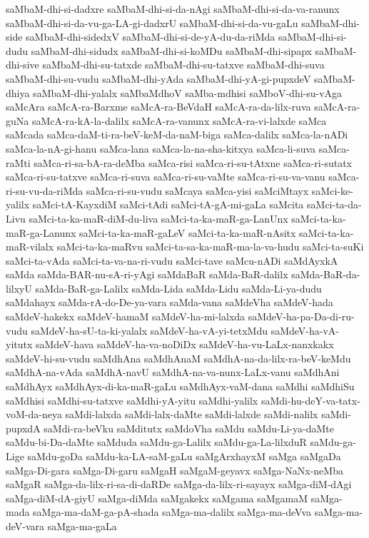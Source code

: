 {saMbaM-dhi-si-dadxre
saMbaM-dhi-si-da-nAgi
saMbaM-dhi-si-da-va-ranunx
saMbaM-dhi-si-da-vu-ga-LA-gi-dadxrU
saMbaM-dhi-si-da-vu-gaLu
saMbaM-dhi-side
saMbaM-dhi-sidedxV
saMbaM-dhi-si-de-yA-du-da-riMda
saMbaM-dhi-si-dudu
saMbaM-dhi-sidudx
saMbaM-dhi-si-koMDu
saMbaM-dhi-sipapx
saMbaM-dhi-sive
saMbaM-dhi-su-tatxde
saMbaM-dhi-su-tatxve
saMbaM-dhi-suva
saMbaM-dhi-su-vudu
saMbaM-dhi-yAda
saMbaM-dhi-yA-gi-pupxdeV
saMbaM-dhiya
saMbaM-dhi-yalalx
saMbaMdhoV
saMba-mdhisi
saMboV-dhi-su-vAga
saMcAra
saMcA-ra-Barxme
saMcA-ra-BeVdaH
saMcA-ra-da-lilx-ruva
saMcA-ra-guNa
saMcA-ra-kA-la-dalilx
saMcA-ra-vanunx
saMcA-ra-vi-lalxde
saMca
saMcada
saMca-daM-ti-ra-beV-keM-da-naM-biga
saMca-dalilx
saMca-la-nADi
saMca-la-nA-gi-hanu
saMca-lana
saMca-la-na-sha-kitxya
saMca-li-suva
saMca-raMti
saMca-ri-sa-bA-ra-deMba
saMca-risi
saMca-ri-su-tAtxne
saMca-ri-sutatx
saMca-ri-su-tatxve
saMca-ri-suva
saMca-ri-su-vaMte
saMca-ri-su-va-vanu
saMca-ri-su-vu-da-riMda
saMca-ri-su-vudu
saMcaya
saMca-yisi
saMciMtayx
saMci-ke-yalilx
saMci-tA-KayxdiM
saMci-tAdi
saMci-tA-gA-mi-gaLa
saMcita
saMci-ta-da-Livu
saMci-ta-ka-maR-diM-du-liva
saMci-ta-ka-maR-ga-LanUnx
saMci-ta-ka-maR-ga-Lanunx
saMci-ta-ka-maR-gaLeV
saMci-ta-ka-maR-nAsitx
saMci-ta-ka-maR-vilalx
saMci-ta-ka-maRvu
saMci-ta-sa-ka-maR-ma-la-va-hudu
saMci-ta-suKi
saMci-ta-vAda
saMci-ta-va-na-ri-vudu
saMci-tave
saMcu-nADi
saMdAyxkA
saMda
saMda-BAR-nu-sA-ri-yAgi
saMdaBaR
saMda-BaR-dalilx
saMda-BaR-da-lilxyU
saMda-BaR-ga-Lalilx
saMda-Lida
saMda-Lidu
saMda-Li-ya-dudu
saMdahayx
saMda-rA-do-De-ya-vara
saMda-vana
saMdeVha
saMdeV-hada
saMdeV-hakekx
saMdeV-hamaM
saMdeV-ha-mi-lalxda
saMdeV-ha-pa-Da-di-ru-vudu
saMdeV-ha-sU-ta-ki-yalalx
saMdeV-ha-vA-yi-tetxMdu
saMdeV-ha-vA-yitutx
saMdeV-hava
saMdeV-ha-va-noDiDx
saMdeV-ha-vu-LaLx-nanxkakx
saMdeV-hi-su-vudu
saMdhAna
saMdhAnaM
saMdhA-na-da-lilx-ra-beV-keMdu
saMdhA-na-vAda
saMdhA-navU
saMdhA-na-va-nunx-LaLx-vanu
saMdhAni
saMdhAyx
saMdhAyx-di-ka-maR-gaLu
saMdhAyx-vaM-dana
saMdhi
saMdhiSu
saMdhisi
saMdhi-su-tatxve
saMdhi-yA-yitu
saMdhi-yalilx
saMdi-hu-deY-va-tatx-voM-da-neya
saMdi-lalxda
saMdi-lalx-daMte
saMdi-lalxde
saMdi-nalilx
saMdi-pupxdA
saMdi-ra-beVku
saMditutx
saMdoVha
saMdu
saMdu-Li-ya-daMte
saMdu-bi-Da-daMte
saMduda
saMdu-ga-Lalilx
saMdu-ga-La-lilxduR
saMdu-ga-Lige
saMdu-goDa
saMdu-ka-LA-saM-gaLu
saMgArxhayxM
saMga
saMgaDa
saMga-Di-gara
saMga-Di-garu
saMgaH
saMgaM-geyavx
saMga-NaNx-neMba
saMgaR
saMga-da-lilx-ri-sa-di-daRDe
saMga-da-lilx-ri-sayayx
saMga-diM-dAgi
saMga-diM-dA-giyU
saMga-diMda
saMgakekx
saMgama
saMgamaM
saMga-mada
saMga-ma-daM-ga-pA-shada
saMga-ma-dalilx
saMga-ma-deVva
saMga-ma-deV-vara
saMga-ma-gaLa
}
